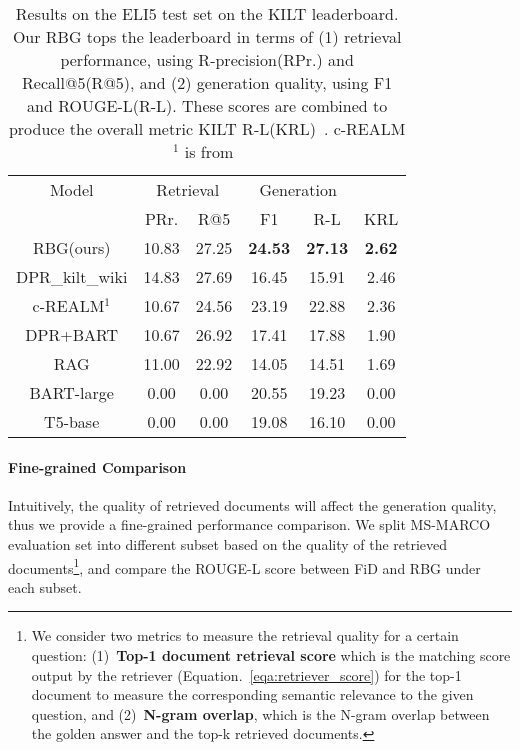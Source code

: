 \documentclass[11pt]{article}
\begin{document}
\begin{table}[!ht]
\resizebox{0.47\textwidth}{!}
{

\begin{tabular}{c|ccccc}
\hline
Model           & \multicolumn{2}{c}{Retrieval} & \multicolumn{2}{c}{Generation} &      \\
                & PRr.       & R@5        & F1           & R-L          & KRL  \\ \hline
RBG(ours)       & 10.83         & 27.25         & \textbf{24.53 }         & \textbf{27.13}         & \textbf{2.62} \\
DPR\_kilt\_wiki &        14.83       &   27.69            &      16.45          &       15.91        &    2.46  \\
c-REALM$^1$  &        10.67       &      24.56         &        23.19        &      22.88         &   2.36   \\
DPR+BART        &    10.67           &       26.92        &       17.41         &        17.88       &  1.90    \\
RAG             &        11.00       &      22.92         &      14.05          &      14.51         &   1.69   \\
BART-large      &          0.00     &         0.00     &     20.55            &    19.23            &     0.00  \\ 
T5-base         &      0.00         &       0.00        &       19.08         &      16.10         &   0.00   \\
\hline
\end{tabular}

}
\caption{Results on the ELI5 test set on the KILT leaderboard. Our RBG tops the leaderboard in terms of (1) retrieval performance, using R-precision(RPr.) and Recall@5(R@5), and (2) generation quality, using F1 and ROUGE-L(R-L). These scores are combined to produce the overall metric KILT R-L(KRL)~\cite{petroni2021kilt}. c-REALM$^1$ is from~\cite{krishna2021hurdles}}
\label{leaderboard}
\vspace{-10pt}
\end{table}

\paragraph{Fine-grained Comparison} Intuitively, the quality of retrieved documents will affect the generation quality, thus we provide a fine-grained performance comparison. We split MS-MARCO evaluation set into different subset based on the quality of the retrieved documents\footnote{\label{foot:retrieve} We consider two metrics to measure the retrieval quality for a certain question: (1)~\textbf{Top-1 document retrieval score} which is the matching score output by the retriever (Equation.~\ref{eqa:retriever_score}) for the top-1 document to measure the corresponding semantic relevance to the given question, and (2)~\textbf{N-gram overlap}, which is the N-gram overlap between the golden answer and the top-k retrieved documents.}, and compare the ROUGE-L score between FiD and RBG under each subset.
\end{document}
